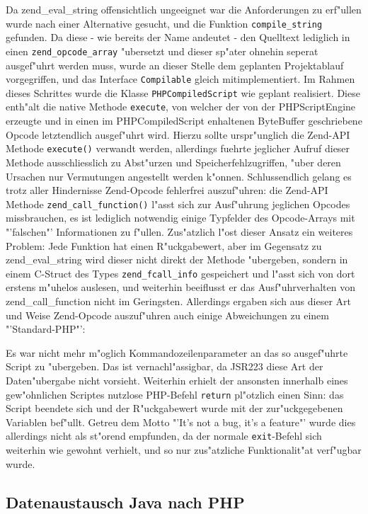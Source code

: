 Da zend\_eval\_string offensichtlich ungeeignet war die Anforderungen zu erf"ullen wurde nach einer Alternative gesucht, und
die Funktion \texttt{compile\_string} gefunden. Da diese - wie bereits der Name andeutet - den Quelltext lediglich in einen
\texttt{zend\_opcode\_array} "ubersetzt und dieser sp"ater ohnehin seperat ausgef"uhrt werden muss, wurde an dieser Stelle dem
geplanten Projektablauf vorgegriffen, und das Interface \texttt{Compilable} gleich mitimplementiert. Im Rahmen dieses Schrittes
wurde die Klasse \texttt{PHPCompiledScript} wie geplant realisiert. Diese enth"alt die native Methode \texttt{execute}, von welcher
der von der PHPScriptEngine erzeugte und in einen im PHPCompiledScript enhaltenen ByteBuffer geschriebene Opcode letztendlich
ausgef"uhrt wird. Hierzu sollte urspr"unglich die Zend-API Methode \texttt{execute()} verwandt werden, allerdings fuehrte jeglicher
Aufruf dieser Methode ausschliesslich zu Abst"urzen und Speicherfehlzugriffen, "uber deren Ursachen nur Vermutungen angestellt
werden k"onnen. Schlussendlich gelang es trotz aller Hindernisse Zend-Opcode fehlerfrei auszuf"uhren: die Zend-API Methode
\texttt{zend\_call\_function()} l"asst sich zur Ausf"uhrung jeglichen Opcodes missbrauchen, es ist lediglich notwendig einige
Typfelder des Opcode-Arrays mit "'falschen"' Informationen zu f"ullen. Zus"atzlich l"ost dieser Ansatz ein weiteres Problem:
Jede Funktion hat einen R"uckgabewert, aber im Gegensatz zu zend\_eval\_string wird dieser nicht direkt der Methode "ubergeben,
sondern in einem C-Struct des Types \texttt{zend\_fcall\_info} gespeichert und l"asst sich von dort erstens m"uhelos auslesen, und
weiterhin beeiflusst er das Ausf"uhrverhalten von zend\_call\_function nicht im Geringsten. Allerdings ergaben sich aus dieser 
Art und Weise Zend-Opcode auszuf"uhren auch einige Abweichungen zu einem "'Standard-PHP"':

Es war nicht mehr m"oglich Kommandozeilenparameter an das so ausgef"uhrte Script zu "ubergeben. Das ist vernachl"assigbar, da
JSR223 diese Art der Daten"ubergabe nicht vorsieht. Weiterhin erhielt der ansonsten innerhalb eines gew"ohnlichen Scriptes nutzlose
PHP-Befehl \texttt{return} pl"otzlich einen Sinn: das Script beendete sich und der R"uckgabewert wurde mit der zur"uckgegebenen
Variablen bef"ullt. Getreu dem Motto "'It's not a bug, it's a feature"' wurde dies allerdings nicht als st"orend empfunden, da
der normale \texttt{exit}-Befehl sich weiterhin wie gewohnt verhielt, und so nur zus"atzliche Funktionalit"at verf"ugbar wurde.

\subsection{Datenaustausch Java nach PHP}
\label{sec:chap1:impl:3}

